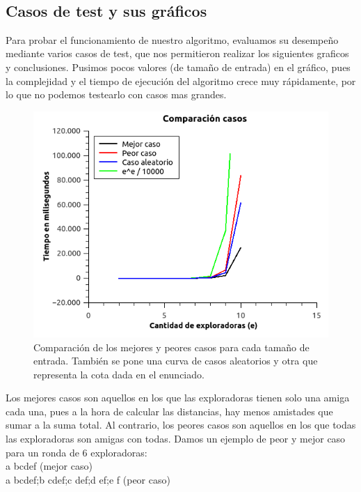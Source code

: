 \begin{itemize}
\\

\subsection{Casos de test y sus gráficos}

Para probar el funcionamiento de nuestro algoritmo, evaluamos su desempeño mediante varios casos de test, que nos permitieron realizar los siguientes 
graficos y conclusiones. Pusimos pocos valores (de tamaño de entrada) en el gráfico, pues la complejidad y el tiempo de ejecución del algoritmo crece
muy rápidamente, por lo que no podemos testearlo con casos mas grandes. 

\begin{figure}[H] 
\begin{center}

  \includegraphics[width=\linewidth]{../graficos/ej3/ComparacionCasos.png}
  \caption{{\small Comparación de los mejores y peores casos para cada tamaño de entrada. También se pone una curva de casos aleatorios y otra que representa la cota dada en el enunciado.}} \label{asd}
\endminipage

\end{center}
\end{figure} 

Los mejores casos son aquellos en los que las exploradoras tienen solo una amiga cada una, pues a la hora de calcular las distancias, hay menos amistades que sumar a la suma total. Al contrario, los peores casos son aquellos en los que todas las exploradoras son amigas con todas. Damos un ejemplo de peor y mejor caso para un ronda de 6 exploradoras: \\
a bcdef (mejor caso) \\
a bcdef;b cdef;c def;d ef;e f (peor caso) \\



\end{itemize}
